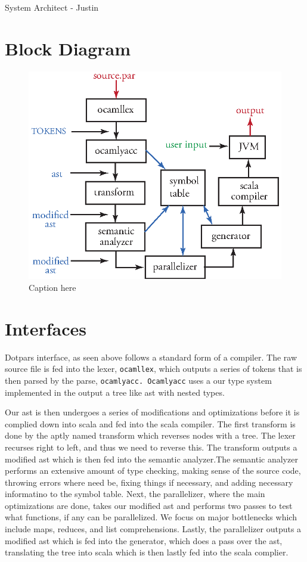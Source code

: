 System Architect - Justin
\section{Block Diagram}
\begin{figure}[H]
\centering
\includegraphics[scale=1]{blockdiagram.eps}
\caption{Caption here}
\end{figure}

\section{Interfaces}
Dotpars interface, as seen above follows a standard form of a compiler. The raw
source file is fed into the lexer, \verb=ocamllex=, which outputs a series of tokens that is then
parsed by the parse, \verb=ocamlyacc. Ocamlyacc= uses a our type system implemented in
the output a tree like ast with nested types. 

Our ast is then undergoes a series of modifications and optimizations before it
is complied down into scala and fed into the scala compiler.  The first transform
is done by the aptly named transform which reverses nodes with a tree.  The lexer recurses right to left, and thus we need to reverse this.  The transform outputs
a modified ast which is then fed into the semantic analyzer.The semantic analyzer 
performs an extensive amount of type checking, making sense of the source code, 
throwing errors where need be, fixing things if necessary, and adding necessary 
informatino to the symbol table.  Next, the parallelizer, where the main optimizations
are done, takes our modified ast and performs two passes to test what functions, 
if any can be parallelized. We focus on major bottlenecks which include maps, reduces,
and list comprehensions. Lastly, the parallelizer outputs a modified ast which is fed
into the generator, which does a pass over the ast, translating the tree into 
scala which is then lastly fed into the scala complier.

